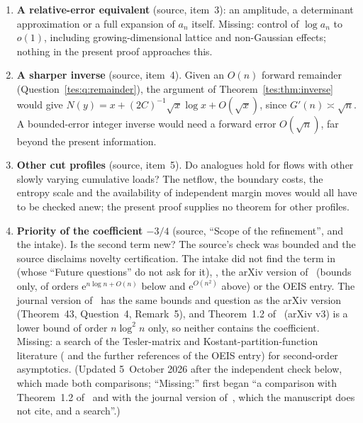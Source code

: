 \documentclass[11pt,a4paper]{article}
\theoremstyle{remark}\newtheorem{remark}[theorem]{Remark}
\newcommand{\ee}{\mathrm e}\newcommand{\dd}{\,\mathrm d}
\numberwithin{equation}{section}
\begin{document}
\begin{enumerate}
 classes as possible contributions.
\item\label{tes:q:equivalent} \textbf{A relative-error equivalent}
 (source, item~3): an amplitude, a determinant approximation or a full
 expansion of $a_n$ itself. Missing: control of $\log a_n$ to $o(1)$,
 including growing-dimensional lattice and non-Gaussian effects; nothing in
 the present proof approaches this.
\item\label{tes:q:inverse} \textbf{A sharper inverse} (source, item~4).
 Given an $O(n)$ forward remainder (Question~\ref{tes:q:remainder}), the
 argument of Theorem~\ref{tes:thm:inverse} would give
 $N(y)=x+(2C)^{-1}\sqrt x\log x+O(\sqrt x)$, since $G'(n)\asymp\sqrt n$.
 A bounded-error integer inverse would need a forward error $O(\sqrt n)$,
 far beyond the present information.
\item\label{tes:q:profiles} \textbf{Other cut profiles} (source, item~5).
 Do analogues hold for flows with other slowly varying cumulative loads? The
 netflow, the boundary costs, the entropy scale and the availability of
 independent margin moves would all have to be checked anew; the present
 proof supplies no theorem for other profiles.
\item\label{tes:q:priority} \textbf{Priority of the coefficient $-3/4$}
 (source, ``Scope of the refinement'', and the intake). Is the second term
 new? The source's check was bounded and the source disclaims novelty
 certification. The intake did not find the term in~\cite{bbm}
 (whose ``Future questions'' do not ask for it), \cite{blp}, the arXiv
 version of~\cite{oneill} (bounds only, of orders $\ee^{n\log n+O(n)}$
 below and $\ee^{O(n^2)}$ above) or the OEIS entry. The journal version
 of~\cite{oneill} has the same bounds and question as the arXiv version
 (Theorem~43, Question~4, Remark~5), and Theorem~1.2 of~\cite{lm} (arXiv
 v3) is a lower bound of order $n\log^2n$ only, so neither contains the
 coefficient. Missing: a search of the Tesler-matrix and
 Kostant-partition-function literature (\cite{haglund,aghrs,mmr} and the
 further references of the OEIS entry) for second-order asymptotics.
 (Updated 5~October 2026 after the independent check below, which made
 both comparisons; ``Missing:'' first began ``a comparison with
 Theorem~1.2 of~\cite{lm} and with the journal version of~\cite{oneill},
 which the manuscript does not cite, and a search''.)
\end{enumerate}
\end{document}
